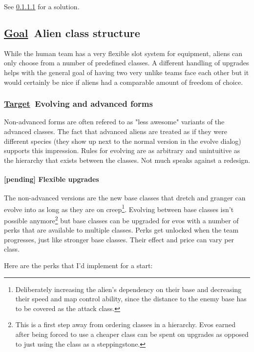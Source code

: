 \documentclass{scrartcl}
\newcommand{\goal}     [0]{\textbf{\underline{Goal}\ }}
\newcommand{\target}   [0]{\textbf{\underline{Target}\ }}
\newcommand{\pending}  [0]{\textcolor{pending}  {\textbf{[pending] }}}
\begin{document}
See \ref{flexible-upgrades} for a solution.

\subsection{\goal Alien class structure}

While the human team has a very flexible slot system for equipment, aliens can only choose from a number of predefined classes. A different handling of upgrades helps with the general goal of having two very unlike teams face each other but it would certainly be nice if aliens had a comparable amount of freedom of choice.

\subsubsection{\target Evolving and advanced forms}

Non-advanced forms are often refered to as "less awesome" variants of the advanced classes. The fact that advanced aliens are treated as if they were different species (they show up next to the normal version in the evolve dialog) supports this impression. Rules for evolving are as arbitrary and unintuitive as the hierarchy that exists between the classes. Not much speaks against a redesign.

\paragraph{\pending Flexible upgrades}
\label{flexible-upgrades}

The non-advanced versions are the new base classes that dretch and granger can evolve into as long as they are on creep\footnote{Deliberately increasing the alien's dependency on their base and decreasing their speed and map control ability, since the distance to the enemy base has to be covered as the attack class.}. Evolving between base classes isn't possible anymore\footnote{This is a first step away from ordering classes in a hierarchy. Evos earned after being forced to use a cheaper class can be spent on upgrades as opposed to just using the class as a steppingstone.} but base classes can be upgraded for evos with a number of perks that are available to multiple classes. Perks get unlocked when the team progresses, just like stronger base classes. Their effect and price can vary per class.

Here are the perks that I'd implement for a start:
\end{document}
